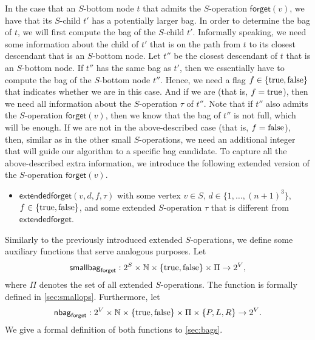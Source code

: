 \documentclass[a4paper,UKenglish,cleveref, autoref, thm-restate, numberwithinsect]{lipics-v2021}
\newcounter{algorithm}
\newcommand{\forget}{\mathsf{forget}}
\newcommand{\extendedforget}{\mathsf{extendedforget}}
\newcommand{\nbagf}{\mathsf{nbag}_{\mathsf{forget}}}
\newcommand{\smallbagf}{\mathsf{smallbag}_{\mathsf{forget}}}
\newcommand{\true}{\textup{true}}
\newcommand{\false}{\textup{false}}
\begin{document}
In the case that an $S$-bottom node $t$ that admits the $S$-operation $\forget(v)$, we have that its $S$-child $t'$ has a potentially larger bag. 
In order to determine the bag of $t$, we will first compute the bag of the $S$-child $t'$. 
Informally speaking, we need some information about the child of $t'$ that is on the path from $t$ to its closest descendant that is an $S$-bottom node.
Let $t''$ be the closest descendant of $t$ that is an $S$-bottom node. If $t''$ has the same bag as $t'$, then we essentially have to compute the bag of the $S$-bottom node $t''$. Hence, we need a flag $f\in\{\true,\false\}$ that indicates whether we are in this case. And if we are (that is, $f=\true$), then we need all information about the $S$-operation $\tau$ of $t''$. Note that if $t''$ also admits the $S$-operation $\forget(v)$, then we know that the bag of $t''$ is not full, which will be enough.
If we are not in the above-described case (that is, $f=\false$), then, similar as in the other small $S$-operations, we need an additional integer that will guide our algorithm to a specific bag candidate.
To capture all the above-described extra information, we introduce the following extended version of the $S$-operation $\forget(v)$.
\begin{itemize}
    \item $\extendedforget(v,d,f, \tau)$ with some vertex $v\in S$, $d\in \{1,\ldots,(n+1)^3\}$, $f\in\{\true,\false\}$, and some extended $S$-operation $\tau$ that is different from $\extendedforget$.
\end{itemize}
Similarly to the previously introduced extended $S$-operations, we define some auxiliary functions that serve analogous purposes. Let
\[
\smallbagf : 2^S\times \mathbb{N}\times\{\true,\false\}\times\Pi\rightarrow 2^V,
\]
where $\Pi$ denotes the set of all extended $S$-operations. The function is formally defined in \cref{sec:smallops}.
Furthermore, let
\[
\nbagf : 2^V\times \mathbb{N}\times\{\true,\false\}\times\Pi\times \{P,L,R\}\rightarrow 2^V.
\]
We give a formal definition of both functions to \cref{sec:bags}.
\end{document}
